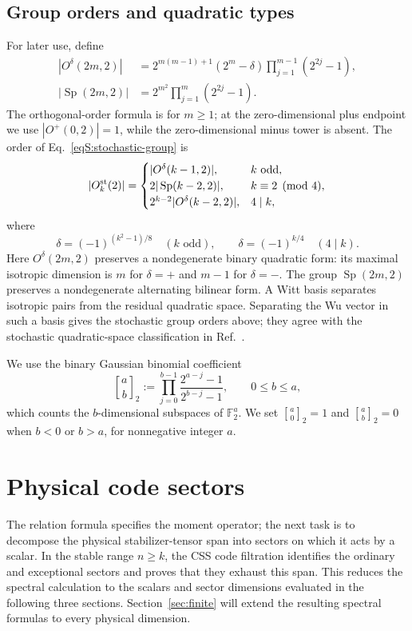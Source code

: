 \documentclass[journal,twocolumn]{IEEEtran}
\theoremstyle{definition}
\theoremstyle{plain}
\newcommand{\F}{\mathbb F}
\newcommand{\Sp}{\operatorname{Sp}}
\newcommand{\gbinom}[3]{\genfrac{[}{]}{0pt}{}{#1}{#2}_{#3}}
\begin{document}
\subsection{Group orders and quadratic types}
For later use, define
\begin{align}
 |O^\delta(2m,2)|
 &=2^{m(m-1)+1}(2^m-\delta)
   \prod_{j=1}^{m-1}(2^{2j}-1),
 \label{eqS:orthogonal-order}\\
 |\Sp(2m,2)|
 &=2^{m^2}\prod_{j=1}^{m}(2^{2j}-1).
 \label{eqS:symplectic-order}
\end{align}
The orthogonal-order formula is for $m\geq1$; at the zero-dimensional plus
endpoint we use $|O^+(0,2)|=1$, while the zero-dimensional minus tower is
absent.
The order of Eq.~\eqref{eqS:stochastic-group} is
\begin{equation}
 |O_k^{\rm st}(2)|=
 \begin{cases}
 |O^\delta(k-1,2)|,&k\text{ odd},\\
 2|\Sp(k-2,2)|,&k\equiv2\pmod4,\\
 2^{k-2}|O^\delta(k-2,2)|,&4\mid k,
 \end{cases}
 \label{eqS:stochastic-order}
\end{equation}
where
\begin{equation}
 \delta=(-1)^{(k^2-1)/8}\quad(k\text{ odd}),
 \qquad
 \delta=(-1)^{k/4}\quad(4\mid k).
 \label{eqS:type}
\end{equation}
Here $O^\delta(2m,2)$ preserves a nondegenerate binary quadratic form:
its maximal isotropic dimension is $m$ for $\delta=+$ and $m-1$ for
$\delta=-$.  The group $\Sp(2m,2)$ preserves a nondegenerate alternating
bilinear form.  A Witt basis separates isotropic pairs from the residual
quadratic space.  Separating the Wu vector in such a basis gives the
stochastic group orders above; they agree
with the stochastic quadratic-space classification in
Ref.~\cite{MontealegreGross2025}.

We use the binary Gaussian binomial coefficient
\begin{equation}
 \gbinom{a}{b}{2}:=
 \prod_{j=0}^{b-1}\frac{2^{a-j}-1}{2^{b-j}-1},
 \qquad 0\leq b\leq a,
 \label{eq:gaussian-binomial}
\end{equation}
which counts the $b$-dimensional subspaces of $\F_2^a$.
We set $\gbinom{a}{0}{2}=1$ and $\gbinom{a}{b}{2}=0$ when
$b<0$ or $b>a$, for nonnegative integer $a$.

\section{Physical code sectors}
\label{sec:filtration}
The relation formula specifies the moment operator; the next task is to
decompose the physical stabilizer-tensor span into sectors on which it
acts by a scalar.  In the stable range $n\geq k$, the CSS code filtration
identifies the ordinary and exceptional sectors and proves that they
exhaust this span.  This reduces the spectral calculation to the scalars
and sector dimensions evaluated in the following three sections.
Section~\ref{sec:finite} will extend the resulting spectral formulas
to every physical dimension.
\end{document}
